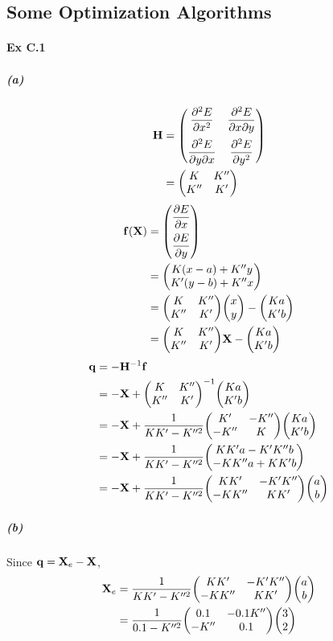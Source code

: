 \documentclass[a4paper]{article}
\newcommand{\ex}[1]{\paragraph{Ex #1}}
\newcommand{\subex}[1]{\subparagraph{#1}}
\newcommand{\dis}{\displaystyle}
\numberwithin{equation}{subsection}
\begin{document}
\subsection{Some Optimization Algorithms}
\ex{C.1}
\subex{(a)}
\begin{align}
\vb{H} &= \mqty(\dis\pdv[2]{E}{x} & \dis\pdv{E}{x}{y} \vspace{5pt}\\ \dis\pdv{E}{y}{x} & \dis\pdv[2]{E}{y}) \notag\\
&= \mqty(K & K'' \\ K'' & K')
\end{align}
\begin{align}
\vb{f}(\vb{X}) &= \mqty(\dis\pdv{E}{x} \vspace{5pt}\\ \dis\pdv{E}{y}) \notag\\
&= \mqty(K(x-a) + K''y \\ K'(y-b) + K''x) \notag\\
&= \mqty(K & K'' \\ K'' & K')\mqty(x\\ y) - \mqty(K a \\ K' b) \notag\\
&= \mqty(K & K'' \\ K'' & K')\vb{X} - \mqty(K a \\ K' b)
\end{align}
\begin{align}
\vb{q} &= -\vb{H}^{-1}\vb{f} \notag\\
&= -\vb{X} + \mqty(K & K'' \\ K'' & K')^{-1} \mqty(K a \\ K' b) \notag\\
&= -\vb{X} + \dfrac{1}{KK' - K''^2} \mqty(K' & -K''\\ -K'' & K) \mqty(K a \\ K' b) \notag\\
&= -\vb{X} + \dfrac{1}{KK' - K''^2} \mqty(KK' a - K'K'' b \\ -KK'' a + KK' b) \notag\\
&= -\vb{X} + \dfrac{1}{KK' - K''^2} \mqty(KK' & -K'K'' \\ -KK'' & KK' ) \mqty(a\\ b)
\end{align}

\subex{(b)}
Since $ \vb{q} = \vb{X}_e - \vb{X} $,
\begin{align}
\vb{X}_e &= \dfrac{1}{KK' - K''^2} \mqty(KK' & -K'K'' \\ -KK'' & KK' ) \mqty(a\\ b) \notag\\
&= \dfrac{1}{0.1 - K''^2} \mqty(0.1 & -0.1 K'' \\ -K'' & 0.1 ) \mqty(3\\ 2) %
\end{align}
\end{document}
